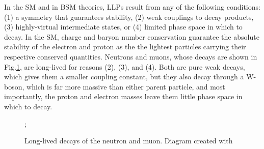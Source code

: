 \documentclass[12pt]{article}
\begin{document}
    In the SM and in BSM theories, LLPs result from any of the following conditions: (1) a symmetry that guarantees stability, (2) weak couplings to decay products, (3) highly-virtual intermediate states, or (4) limited phase space in which to decay. In the SM, charge and baryon number conservation guarantee the absolute stability of the electron and proton as the the lightest particles carrying their respective conserved quantities. Neutrons and muons, whose decays are shown in Fig.\ref{sm_llp_processes}, are long-lived for reasons (2), (3), and (4). Both are pure weak decays, which gives them a smaller coupling constant, but they also decay through a W-boson, which is far more massive than either parent particle, and most importantly, the proton and electron masses leave them little phase space in which to decay. 

        \noindent \begin{figure}[htbp] \begin{center}
            \qquad\qquad
            ;
            \caption{Long-lived decays of the neutron and muon. Diagram created with~\cite{tikz}}
            \label{sm_llp_processes}
        \end{center} \end{figure}
\end{document}
